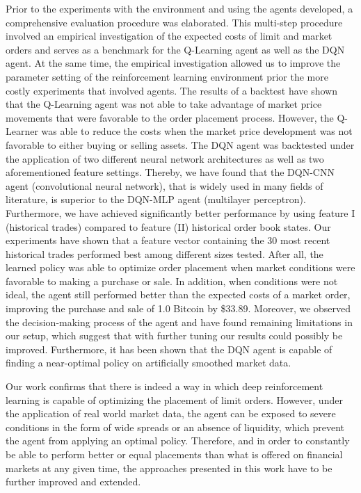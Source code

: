 Prior to the experiments with the environment and using the agents developed, a comprehensive evaluation procedure was elaborated.
This multi-step procedure involved an empirical investigation of the expected costs of limit and market orders and serves as a benchmark for the Q-Learning agent as well as the DQN agent.
At the same time, the empirical investigation allowed us to improve the parameter setting of the reinforcement learning environment prior the more costly experiments that involved agents.
The results of a backtest have shown that the Q-Learning agent was not able to take advantage of market price movements that were favorable to the order placement process.
However, the Q-Learner was able to reduce the costs when the market price development was not favorable to either buying or selling assets.
The DQN agent was backtested under the application of two different neural network architectures as well as two aforementioned feature settings.
Thereby, we have found that the DQN-CNN agent (convolutional neural network), that is widely used in many fields of literature, is superior to the DQN-MLP agent (multilayer perceptron).
Furthermore, we have achieved significantly better performance by using feature I (historical trades) compared to feature (II) historical order book states.
Our experiments have shown that a feature vector containing the 30 most recent historical trades performed best among different sizes tested.
After all, the learned policy was able to optimize order placement when market conditions were favorable to making a purchase or sale.
In addition, when conditions were not ideal, the agent still performed better than the expected costs of a market order, improving the purchase and sale of 1.0 Bitcoin by \$33.89.
Moreover, we observed the decision-making process of the agent and have found remaining limitations in our setup, which suggest that with further tuning our results could possibly be improved.
Furthermore, it has been shown that the DQN agent is capable of finding a near-optimal policy on artificially smoothed market data.

Our work confirms that there is indeed a way in which deep reinforcement learning is capable of optimizing the placement of limit orders.
However, under the application of real world market data, the agent can be exposed to severe conditions in the form of wide spreads or an absence of liquidity, which prevent the agent from applying an optimal policy.
Therefore, and in order to constantly be able to perform better or equal placements than what is offered on financial markets at any given time, the approaches presented in this work have to be further improved and extended.

